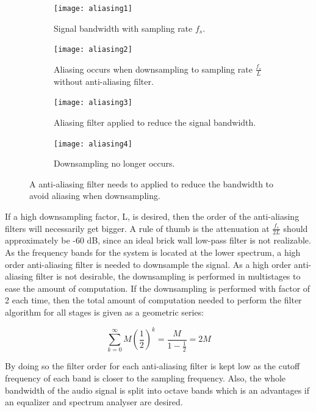 \begin{figure}[H]
\centering
\begin{subfigure}[t]{0.44\textwidth}
\texttt{[image: aliasing1]}
	\caption{Signal bandwidth with sampling rate $f_s$.}
	\label{fig:aliasing1}
\end{subfigure}
\hspace{6mm} 
\begin{subfigure}[t]{0.47\textwidth}
\texttt{[image: aliasing2]}
	\caption{Aliasing occurs when downsampling to sampling rate $\frac{f_s}{L}$ without anti-aliasing filter.}
	\label{fig:aliasing2}
\end{subfigure}
\hspace{6mm}
\begin{subfigure}[b]{0.44\textwidth}
\texttt{[image: aliasing3]}
	\caption{Aliasing filter applied to reduce the signal bandwidth.}
	\label{fig:aliasing3}
\end{subfigure}
\hspace{6mm} 
\begin{subfigure}[b]{0.47\textwidth}
\texttt{[image: aliasing4]}
	\caption{Downsampling no longer occurs.}
	\label{fig:aliasing4}
\end{subfigure}
\caption{A anti-aliasing filter needs to applied to reduce the bandwidth to avoid aliasing when downsampling.}
\label{fig:aliasing}
\end{figure}

If a high downsampling factor, L, is desired, then the order of the anti-aliasing filters will necessarily get bigger. A rule of thumb is the attenuation at $\frac{f_s}{2L}$ should approximately be -60 dB, since an ideal brick wall low-pass filter is not realizable. As the frequency bands for the system is located at the lower spectrum, a high order anti-aliasing filter is needed to downsample the signal. As a high order anti-aliasing filter is not desirable, the downsampling is performed in multistages to ease the amount of computation. If the downsampling is performed with factor of 2 each time, then the total amount of computation needed to perform the filter algorithm for all stages is given as a geometric series:

\begin{equation} \label{eq:z_transformation_example}
\sum_{k=0}^{\infty}M \left( \frac{1}{2} \right)^k  = \frac{M}{1-\frac{1}{2}} = 2M
\end{equation}

By doing so the filter order for each anti-aliasing filter is kept low as the cutoff frequency of each band is closer to the sampling frequency. Also, the whole bandwidth of the audio signal is split into octave bands which is an advantages if an equalizer and spectrum analyser are desired.

